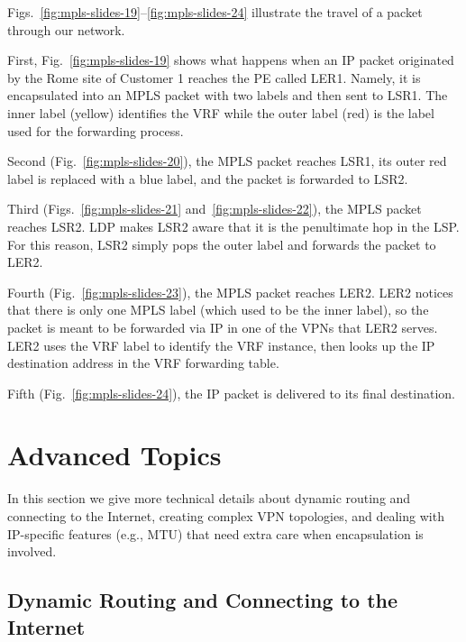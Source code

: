 \documentclass{article}
\begin{document}
\begin{shaded}
\noindent
Figs.~\ref{fig:mpls-slides-19}--\ref{fig:mpls-slides-24} illustrate the travel of a
packet through our network.

First, Fig.~\ref{fig:mpls-slides-19} shows what happens when an IP packet 
originated by the Rome site of Customer 1 reaches the PE called LER1. Namely, it 
is encapsulated into an MPLS packet with two labels and then sent to LSR1. The 
inner label (yellow) identifies the VRF while the outer label (red) is the label 
used for the forwarding process.

Second (Fig.~\ref{fig:mpls-slides-20}), the MPLS packet reaches LSR1, its outer 
red label is replaced with a blue label, and the packet is forwarded to LSR2.

Third (Figs.~\ref{fig:mpls-slides-21} and~\ref{fig:mpls-slides-22}), the MPLS 
packet reaches LSR2. LDP makes LSR2 aware that it is the penultimate hop in the 
LSP. For this reason, LSR2 simply pops the outer label and forwards the packet 
to LER2.

Fourth (Fig.~\ref{fig:mpls-slides-23}), the MPLS packet reaches LER2. LER2 
notices that there is only one MPLS label (which used to be the inner label), so 
the packet is meant to be forwarded via IP in one of the VPNs that LER2 serves. 
LER2 uses the VRF label to identify the VRF instance, then looks up the IP 
destination address in the VRF forwarding table.

Fifth (Fig.~\ref{fig:mpls-slides-24}), the IP packet is delivered to its final
destination.
\end{shaded}




\section{Advanced Topics}\label{se:advanced}

In this section we give more technical details about dynamic routing and connecting to the
Internet, creating complex VPN topologies, and dealing with IP-specific 
features (e.g., MTU) that need extra care when encapsulation is involved.

%
%
\subsection{Dynamic Routing and Connecting to the Internet}\label{sse:internet}
\end{document}
